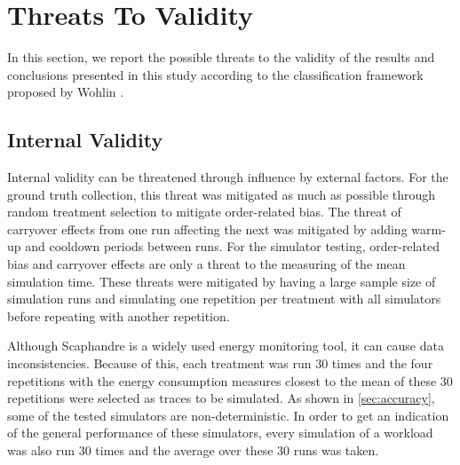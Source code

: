 \section{Threats To Validity}\label{sec:threats}
In this section, we report the possible threats to the validity of the results and conclusions presented in this study according to the classification framework proposed by Wohlin \etal \cite{wohlin_experimentation_2012}.

\subsection{Internal Validity}\label{sec:internal_threats}
Internal validity can be threatened through influence by external factors. For the ground truth collection, this threat was mitigated as much as possible through random treatment selection to mitigate order-related bias. The threat of carryover effects from one run affecting the next was mitigated by adding warm-up and cooldown periods between runs. For the simulator testing, order-related bias and carryover effects are only a threat to the measuring of the mean simulation time. These threats were mitigated by having a large sample size of simulation runs and simulating one repetition per treatment with all simulators before repeating with another repetition. 

Although Scaphandre is a widely used energy monitoring tool, it can cause data inconsistencies. Because of this, each treatment was run 30 times and the four repetitions with the energy consumption measures closest to the mean of these 30 repetitions were selected as traces to be simulated. As shown in \autoref{sec:accuracy}, some of the tested simulators are non-deterministic. In order to get an indication of the general performance of these simulators, every simulation of a workload was also run 30 times and the average over these 30 runs was taken.

